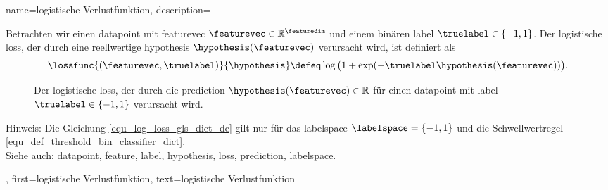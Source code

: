 {{{{
{
name={logistische Verlustfunktion}, 
description={
Betrachten wir einen \gls{datapoint} mit \gls{featurevec} $\featurevec \in \mathbb{R}^{\featuredim}$ und einem binären \gls{label} $\truelabel \in \{-1,1\}$. Der logistische \gls{loss}, der durch eine reellwertige \gls{hypothesis} $\hypothesis(\featurevec)$ verursacht wird, ist definiert als
\begin{equation} 
\label{equ_log_loss_gls_dict_de}
\lossfunc{(\featurevec,\truelabel)}{\hypothesis} \defeq \log \big( 1 + \exp(- \truelabel \hypothesis(\featurevec)) \big).
\end{equation}
\begin{figure}[H]
\begin{center}
\caption{Der logistische \gls{loss}, der durch die \gls{prediction} $\hypothesis(\featurevec) \in \mathbb{R}$ für einen \gls{datapoint} mit \gls{label} $\truelabel \in \{-1,1\}$ verursacht wird.}
\label{fig_logloss_dict_de}
\end{center}
\end{figure}
Hinweis: Die Gleichung \eqref{equ_log_loss_gls_dict_de} gilt nur für das \gls{labelspace} $\labelspace = \{-1,1\}$ und die Schwellwertregel \eqref{equ_def_threshold_bin_classifier_dict}.\\
Siehe auch: \gls{datapoint}, \gls{feature}, \gls{label}, \gls{hypothesis}, \gls{loss}, \gls{prediction}, \gls{labelspace}.
},
first={logistische Verlustfunktion},
text={logistische Verlustfunktion}
}

}}}}
